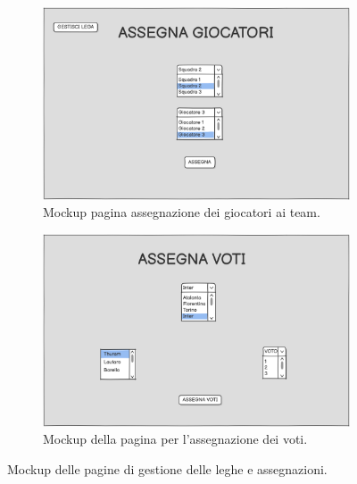 \begin{figure}[H]
    \begin{subfigure}[b]{0.49\textwidth}
        \centering
        \includegraphics[width=\textwidth]{Resources/Mockups/AssegnaGiocatori.png}
        \caption{Mockup pagina assegnazione dei giocatori ai team.}
        \label{fig:pagina_assegna_giocatori}
    \end{subfigure}
    \hfill
    \begin{subfigure}[b]{0.49\textwidth}
        \centering
        \includegraphics[width=\textwidth]{Resources/Mockups/AssegnaVoti.png}
        \caption{Mockup della pagina per l'assegnazione dei voti.}
        \label{fig:pagina_assegna_voti}
    \end{subfigure}

    \caption{Mockup delle pagine di gestione delle leghe e assegnazioni.}
    \label{fig:mockup_parte4}
\end{figure}
